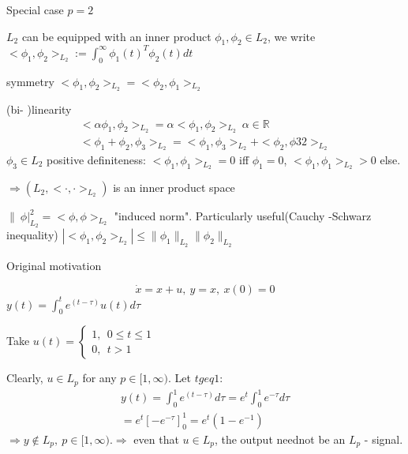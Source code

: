 Special case $p = 2$ 

$L_2$ can be equipped with an inner product $\phi_1, \phi_2 \in L_2$, we write $<\phi_1, \phi_2>_{L_2} :=  \int_0^{\infty} \phi_1(t)^T\phi_2(t)dt$

symmetry $<\phi_1, \phi_2>_{L_2} = <\phi_2, \phi_1>_{L_2}$

(bi- )linearity 
\begin{equation*}
\begin{split}
<\alpha \phi_1, \phi_2>_{L_2} = \alpha <\phi_1, \phi_2>_{L_2} \ \alpha \in \mathbb{R} \\ 
<\phi_1 + \phi_2, \phi_3>_{L_2} = <\phi_1, \phi_3>_{L_2} + <\phi_2, \phi32>_{L_2}
\end{split}
\end{equation*}
$\phi_3 \in L_2$ 
positive definiteness: $<\phi_1, \phi_1>_{L_2} = 0$ iff $\phi_1 = 0$, $<\phi_1, \phi_1>_{L_2} > 0$ else.

$\Rightarrow (L_2, <\cdot, \cdot>_{L_2})$ is an inner product space

$\|\ \phi|_{L_2}^2 = < \phi, \phi>_{L_2}$ "induced norm". Particularly useful(Cauchy -Schwarz inequality) $|<\phi_1,\phi_2>_{L_2}| \leq \|\phi_1\|_{L_2}\|\phi_2\|_{L_2}$

Original motivation 


\begin{Example}
\begin{equation*}
\dot{x} = x+u, \ y = x, \ x(0) = 0
\end{equation*}
$y(t) = \int_0^te^(t-\tau)u(t)d\tau$

Take $u(t) = \left\{
                \begin{array}{ll}
                  1, \ \ 0 \leq t \leq 1\\
                  0, \ \ t > 1
                \end{array}
              \right. $
              
Clearly, $u \in L_p$ for any $p \in [1,\infty)$. Let $t geq 1$: 
\begin{equation*}
\begin{split}
y(t) = \int_0^1 e^{(t-\tau)}d\tau = e^t\int_0^1e^{-\tau}d\tau \\
= e^t[-e^{-\tau}]^1_0 = e^t(1-e^{-1})
\end{split}
\end{equation*}
$\Rightarrow y \not\in L_p, \ p \in [1,\infty) $.$\Rightarrow $ even that $ u \in L_p$, the output neednot be an $L_p$ - signal.
\end{Example}

